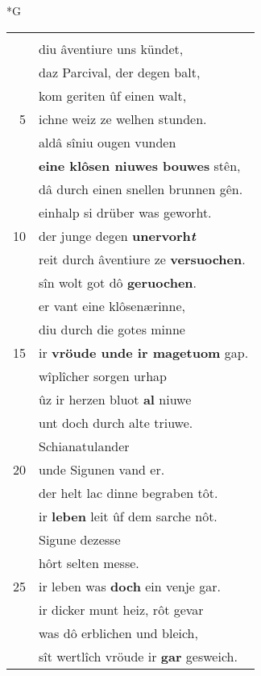 \documentclass[8pt,a4paper,notitlepage]{article}
\begin{document}
\begin{table}[ht]
\begin{minipage}[t]{0.5\linewidth}
\small
\begin{center}*G
\end{center}
\begin{tabular}{rl}
 & \textbf{\begin{large}S\end{large}werz} niht geloubet, der sündet.\\ 
 & diu âventiure uns kündet,\\ 
 & daz Parcival, der degen balt,\\ 
 & kom geriten ûf einen walt,\\ 
5 & ichne weiz ze welhen stunden.\\ 
 & aldâ sîniu ougen vunden\\ 
 & \textbf{eine klôsen niuwes bouwes} stên,\\ 
 & dâ durch einen snellen brunnen gên.\\ 
 & einhalp si drüber was geworht.\\ 
10 & der junge degen \textbf{unervorh\textit{t}}\\ 
 & reit durch âventiure ze \textbf{versuochen}.\\ 
 & sîn wolt got dô \textbf{geruochen}.\\ 
 & er vant eine klôsenærinne,\\ 
 & diu durch die gotes minne\\ 
15 & ir \textbf{vröude unde ir magetuom} gap.\\ 
 & wîplîcher sorgen urhap\\ 
 & ûz ir herzen bluot \textbf{al} niuwe\\ 
 & unt doch durch alte triuwe.\\ 
 & Schianatulander\\ 
20 & unde Sigunen vand er.\\ 
 & der helt lac dinne begraben tôt.\\ 
 & ir \textbf{leben} leit ûf dem sarche nôt.\\ 
 & Sigune dezesse\\ 
 & hôrt selten messe.\\ 
25 & ir leben was \textbf{doch} ein venje gar.\\ 
 & ir dicker munt heiz, rôt gevar\\ 
 & was dô erblichen und bleich,\\ 
 & sît wertlîch vröude ir \textbf{gar} gesweich.\\ 

\end{tabular}
\end{minipage}
\end{table}
\end{document}
